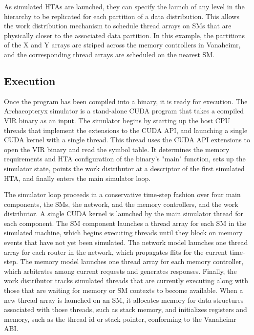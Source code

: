 \documentclass[conference, 10pt]{IEEEtran}
\begin{document}
As simulated HTAs are launched, they can specify the launch of any level in the
hierarchy to be replicated for each partition of a data distribution.  This
allows the work distribution mechanism to schedule thread arrays on SMs that
are physically closer to the associated data partition.  In this example, the
partitions of the X and Y arrays are striped across the memory controllers in
Vanaheimr, and the corresponding thread arrays are scheduled on the nearest SM.

\subsection{Execution}

Once the program has been compiled into a binary, it is ready for execution. 
The Archaeopteryx simulator is a stand-alone CUDA program that takes a compiled
VIR binary as an input.  The simulator begins by starting up the host CPU
threads that implement the extensions to the CUDA API, and launching a single
CUDA kernel with a single thread.   This thread uses the CUDA API extensions to
open the VIR binary and read the symbol table.  It determines the memory
requirements and HTA configuration of the binary's "main" function, sets up the
simulator state, points the work distributor at a descriptor of the first
simulated HTA, and finally enters the main simulator loop.  

The simulator loop proceeds in a conservative
time-step fashion over four main components, the SMs, the network, and the
memory controllers, and the work distributor.  A single CUDA kernel is launched
by the main simulator thread for each component.  The SM component launches a
thread array for each SM in the simulated machine, which begins executing
threads until they block on memory events that have not yet been simulated. 
The network model launches one thread array for each router in the network,
which propagates flits for the current time-step.  The memory model launches one
thread array for each memory controller, which arbitrates among current requests
and generates responses.  Finally, the work distributor tracks simulated threads
that are currently executing along with those that are waiting for memory or
SM contexts to become available.  When a new thread array is launched on an SM,
it allocates memory for data structures associated with those threads, such as
stack memory, and initializes registers and memory, such as the thread id or
stack pointer, conforming to the Vanaheimr ABI.
\end{document}
